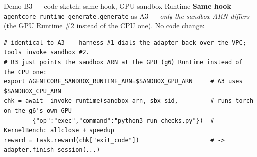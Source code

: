 \documentclass[aspectratio=169]{beamer}
\begin{document}
\begin{frame}[fragile]{Demo B3 --- code sketch: same hook, GPU sandbox Runtime}
  \footnotesize\textbf{Same hook} \texttt{agentcore\_runtime\_generate.generate} as A3 --- \emph{only the
  sandbox ARN differs} (the GPU Runtime \#2 instead of the CPU one). No code change:
\begin{lstlisting}[basicstyle=\ttfamily\scriptsize]
# identical to A3 -- harness #1 dials the adapter back over the VPC; tools invoke sandbox #2.
# B3 just points the sandbox ARN at the GPU (g6) Runtime instead of the CPU one:
export AGENTCORE_SANDBOX_RUNTIME_ARN=$SANDBOX_GPU_ARN     # A3 uses $SANDBOX_CPU_ARN
chk = await _invoke_runtime(sandbox_arn, sbx_sid,         # runs torch on the g6's own GPU
        {"op":"exec","command":"python3 run_checks.py"})  # KernelBench: allclose + speedup
reward = task.reward(chk["exit_code"])                    # -> adapter.finish_session(...)
\end{lstlisting}
\end{frame}
\end{document}
